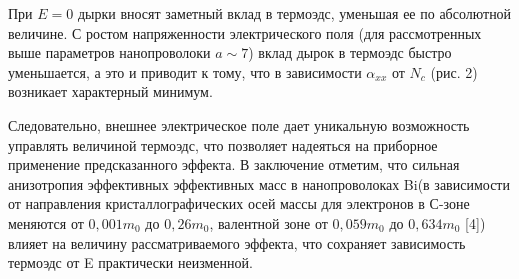При $E=0$ дырки вносят заметный вклад в термоэдс, уменьшая ее по абсолютной величине. С ростом напряженности электрического поля (для рассмотренных выше параметров нанопроволоки $a\sim 7$) вклад дырок в термоэдс быстро уменьшается, а это и приводит к тому, что в зависимости $\alpha _{xx} $ от $N_{c} $ (рис. 2) возникает характерный минимум.
 
Следовательно, внешнее электрическое поле дает уникальную возможность управлять величиной термоэдс, что позволяет надеяться  на приборное применение предсказанного эффекта. В заключение отметим, что сильная анизотропия эффективных эффективных масс в нанопроволоках Bi(в зависимости от направления кристаллографических осей массы для электронов в С-зоне меняются от $0,001m_{0} $ до $0,26m_{0} $, валентной зоне от $0,059m_{0} $ до $0,634m_{0} $ [4]) влияет на величину рассматриваемого эффекта, что сохраняет зависимость термоэдс от E практически неизменной.
